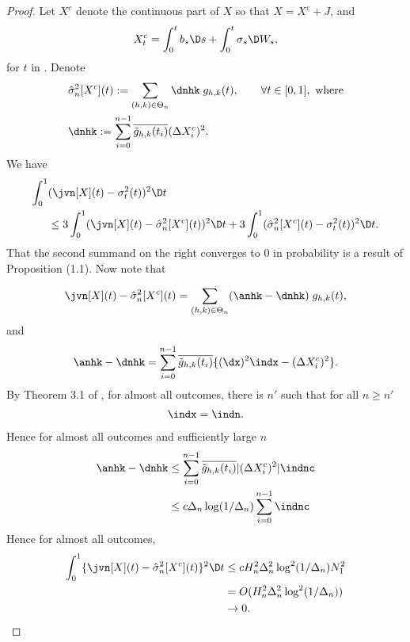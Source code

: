 \begin{proof}
  Let $X^c$ denote the continuous part of $X$ so that $X = X^c + J$, and 
  \begin{align}
  X^c_t = \int^t_0 b_s \D s + \int^t_0 \sigma_s \D W_s,
    \label{eq:contpart}
  \end{align}
  for $t$ in \domain. Denote
  \begin{align}
    & \svn[X^c](t):=\sum_{(h,k) \in \Theta_n} \dnhk\;g_{h,k}(t), \qquad \forall t \in [0,1], \text{ where}\\
  &\dnhk := \sum_{i =0}^{n-1} \btghki (\Delta X^c_i)^2.  \notag
    \label{}
  \end{align}
We have
\begin{align}
  \int_0^1 & (\jvn[X](t)  - \sv(t))^2\D t \notag\\
  & \le  3 \int_0^1  (\jvn[X](t)  - \svn[X^c](t))^2\D t +   3\int_0^1  (\svn[X^c](t) - \sv(t) )^2\D t.
\end{align}
That the second summand on the right converges to 0 in probability is a result of Proposition (1.1). 
Now note that

\begin{align}
 \jvn[X](t)  - \svn[X^c](t) = \sum_{(h,k) \in \Theta_n} (\anhk - \dnhk)\;g_{h,k}(t),\notag
  \label{}
\end{align}
and 
\begin{align}
  \anhk - \dnhk = \sum_{i =0}^{n-1} \btghki\{ (\dx)^2 \indx- (\Delta X^c_i)^2\}.\notag
  \label{}
\end{align}
By Theorem 3.1 of \cite{Mancini2009}, for almost all outcomes, there is $n'$ such that for all $n \ge n'$ 
\begin{align}
  \indx =\indn. \notag
  \label{}
\end{align}
Hence for almost all outcomes and sufficiently large $n$  
\begin{align}
   \anhk - \dnhk &\le \sum_{i =0}^{n-1} \btghki \vert (\Delta X^c_i)^2\vert  \indnc\notag\\
& \le  c \Delta_n \log(1/\Delta_n)\sum_{i =0}^{n-1}\indnc \notag \\
  \label{}
\end{align}
Hence for almost all outcomes,
\begin{align}
  \int^1_0\{\jvn[X](t)  - \svn[X^c](t)\}^2 \D t & \le c H_n^2 \Delta_n^2\log^2(1/\Delta_n) N_1^2\notag\\
  & = O(H_n^2 \Delta_n^2\log^2(1/\Delta_n))\notag \\
  & \to 0.
  \label{}
\end{align}
\end{proof}
